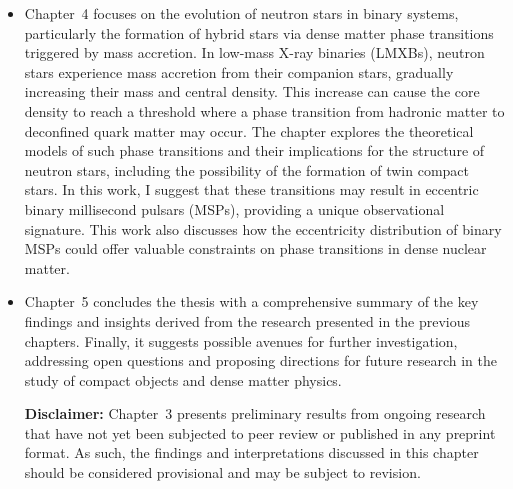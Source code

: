 \documentclass[main.tex]{subfiles}
\begin{document}
\begin{itemize}
        \item Chapter~4 focuses on the evolution of neutron stars in binary systems, particularly the formation of hybrid stars via dense matter phase transitions triggered by mass accretion. In low-mass X-ray binaries (LMXBs), neutron stars experience mass accretion from their companion stars, gradually increasing their mass and central density. This increase can cause the core density to reach a threshold where a phase transition from hadronic matter to deconfined quark matter may occur. The chapter explores the theoretical models of such phase transitions and their implications for the structure of neutron stars, including the possibility of the formation of twin compact stars. In this work, I suggest that these transitions may result in eccentric binary millisecond pulsars (MSPs), providing a unique observational signature. This work also discusses how the eccentricity distribution of binary MSPs could offer valuable constraints on phase transitions in dense nuclear matter.

        \item Chapter~5 concludes the thesis with a comprehensive summary of the key findings and insights derived from the research presented in the previous chapters. Finally, it suggests possible avenues for further investigation, addressing open questions and proposing directions for future research in the study of compact objects and dense matter physics.

        \vspace{2cm}

        \textbf{Disclaimer:} 
        Chapter~3 presents preliminary results from ongoing research that have not yet been subjected to peer review or published in any preprint format. As such, the findings and interpretations discussed in this chapter should be considered provisional and may be subject to revision.
        
    \end{itemize}
    
\end{document}
